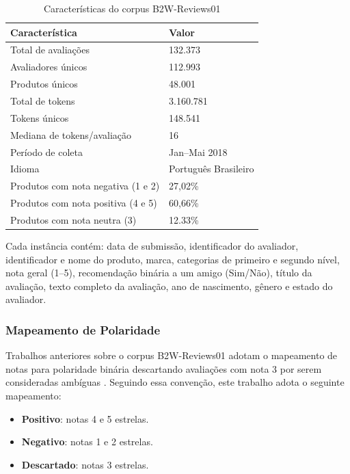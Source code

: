 \documentclass{IEEEtran}
\begin{document}
\begin{table}[htbp]
  \centering
  \caption{Características do corpus B2W-Reviews01}
  \label{tab:dataset}
  \begin{tabular}{ll}
    \toprule
    \textbf{Característica} & \textbf{Valor} \\
    \midrule
    Total de avaliações & 132.373 \\
    Avaliadores únicos & 112.993 \\
    Produtos únicos & 48.001 \\
    Total de tokens & 3.160.781 \\
    Tokens únicos & 148.541 \\
    Mediana de tokens/avaliação & 16 \\
    Período de coleta & Jan--Mai 2018 \\
    Idioma & Português Brasileiro \\
    Produtos com nota negativa (1 e 2) & 27,02\% \\
    Produtos com nota positiva (4 e 5) & 60,66\% \\
    Produtos com nota neutra (3) & 12.33\% \\
    \bottomrule
  \end{tabular}
\end{table}

Cada instância contém: data de submissão, identificador do avaliador, identificador e nome do produto, marca, categorias de primeiro e segundo nível, nota geral (1--5), recomendação binária a um amigo (Sim/Não), título da avaliação, texto completo da avaliação, ano de nascimento, gênero e estado do avaliador.


\subsubsection{Mapeamento de Polaridade}
\label{subsubsec:polarity}

Trabalhos anteriores sobre o corpus B2W-Reviews01 adotam o mapeamento de notas para polaridade binária descartando avaliações com nota 3 por serem consideradas ambíguas \cite{real2019b2w}. Seguindo essa convenção, este trabalho adota o seguinte mapeamento:

\begin{itemize}[noitemsep]
  \item \textbf{Positivo}: notas 4 e 5 estrelas.
  \item \textbf{Negativo}: notas 1 e 2 estrelas.
  \item \textbf{Descartado}: notas 3 estrelas.
\end{itemize}
\end{document}
